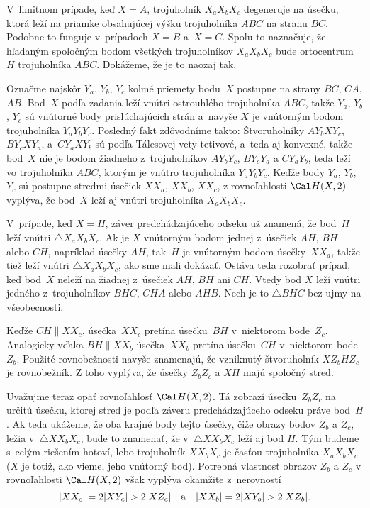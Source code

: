 {%
V~limitnom prípade, keď $X=A$, trojuholník $X_aX_bX_c$ degeneruje na
úsečku,
ktorá leží na priamke obsahujúcej výšku trojuholníka $ABC$ na stranu $BC$.
Podobne to funguje v~prípadoch $X=B$ a~$X=C$. Spolu to naznačuje,
že hľadaným spoločným bodom všetkých trojuholníkov $X_aX_bX_c$ bude ortocentrum~$H$
trojuholníka $ABC$. Dokážeme, že je to naozaj tak.

Označme najskôr $Y_a$, $Y_b$, $Y_c$ kolmé priemety bodu~$X$
postupne na strany $BC$, $CA$, $AB$. Bod~$X$ podľa zadania leží
vnútri ostrouhlého trojuholníka $ABC$, takže $Y_a$, $Y_b$, $Y_c$ sú
vnútorné body prislúchajúcich strán a~navyše $X$ je vnútorným bodom
trojuholníka $Y_aY_bY_c$. Posledný fakt zdôvodníme takto:
Štvoruholníky $AY_bXY_c$, $BY_cXY_a$,
a~$CY_aXY_b$ sú podľa Tálesovej vety tetivové, a~teda aj konvexné,
takže bod~$X$
nie je bodom žiadneho z~trojuholníkov $AY_bY_c$, $BY_cY_a$ a $CY_aY_b$,
teda leží vo  trojuholníka $ABC$, ktorým je vnútro trojuholníka
$Y_aY_bY_c$. Keďže body $Y_a$, $Y_b$, $Y_c$
sú postupne stredmi úsečiek $XX_a$, $XX_b$,
$XX_c$, z rovnoľahlosti ${\Cal H}(X,2)$ vyplýva, že bod~$X$
leží aj vnútri trojuholníka $X_aX_bX_c$.

V~prípade, keď $X=H$, záver predchádzajúceho odseku už znamená, že bod~$H$
leží vnútri $\triangle X_aX_bX_c$. Ak je $X$ vnútorným bodom
jednej z~úsečiek $AH$, $BH$ alebo $CH$, napríklad úsečky $AH$,
tak~$H$ je vnútorným bodom úsečky~$XX_a$, takže tiež
leží vnútri $\triangle X_aX_bX_c$, ako sme mali dokázať. Ostáva
teda rozobrať prípad, keď bod~$X$ neleží na žiadnej z~úsečiek
$AH$, $BH$ ani $CH$. Vtedy bod $X$ leží vnútri jedného
z~trojuholníkov $BHC$, $CHA$ alebo $AHB$. Nech je to $\triangle BHC$
bez ujmy na všeobecnosti.
%

Keďže $CH \parallel XX_c$, úsečka~$XX_c$ pretína úsečku~$BH$
v~niektorom bode~$Z_c$. Analogicky vďaka $BH \parallel XX_b$
úsečka~$XX_b$ pretína úsečku~$CH$ v~niektorom bode~$Z_b$.
Použité rovnobežnosti navyše znamenajú, že vzniknutý štvoruholník $XZ_bHZ_c$
je rovnobežník. Z toho vyplýva, že úsečky $Z_bZ_c$ a $XH$ majú
spoločný stred.

Uvažujme teraz opäť rovnoľahlosť ${\Cal H}(X,2)$. Tá zobrazí
úsečku~$Z_bZ_c$ na určitú úsečku, ktorej stred je podľa
záveru predchádzajúceho odseku práve bod~$H$. Ak teda ukážeme, že
oba krajné body tejto úsečky, čiže obrazy bodov $Z_b$ a $Z_c$,
ležia v~$\triangle XX_bX_c$, bude to znamenať, že v~$\triangle XX_bX_c$
leží aj bod $H$. Tým budeme s~celým riešením hotoví,
lebo trojuholník $XX_bX_c$ je časťou trojuholníka $X_aX_bX_c$ ($X$ je totiž,
ako vieme, jeho vnútorný bod).
Potrebná vlastnosť obrazov $Z_b$ a $Z_c$ v rovnoľahlosti
${\Cal H}(X,2)$ však vyplýva okamžite z~nerovností
$$
|XX_c|=2|XY_c|>2|XZ_c|\quad\hbox{a}\quad |XX_b|=2|XY_b|>2|XZ_b|.
$$

}
